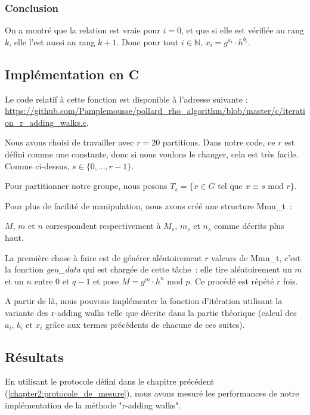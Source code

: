         \subsubsection*{Conclusion}
        On a montré que la relation est vraie pour $i = 0$, et que si elle est vérifiée au rang $k$, elle l'est aussi au rang $k + 1$. Donc pour tout $i \in \mathbb{N}$, $x_i = g^{a_i} \cdot h^{b_i}$.

      \subsection{Implémentation en C}
      \label{chapter3:r-adding:implémentation}
      Le code relatif à cette fonction est disponible à l'adresse suivante : \url{https://github.com/Pamplemousse/pollard_rho_algorithm/blob/master/c/iteration_r_adding_walks.c}.

      Nous avons choisi de travailler avec $r = 20$ partitions. Dans notre code, ce $r$ est défini comme une constante, donc si nous voulons le changer, cela est très facile. Comme ci-dessus, $s \in \{ 0,..., r - 1 \}$.

      Pour partitionner notre groupe, nous posons $T_s = \{ x \in G \text{ tel que } x \equiv s \text{ mod } r \}$.

      Pour plus de facilité de manipulation, nous avons créé une structure Mmn\_t~:

      

      $M$, $m$ et $n$ correspondent respectivement à $M_s$, $m_s$ et $n_s$ comme décrits plus haut.

      La première chose à faire est de générer aléatoirement $r$ valeurs de Mmn\_t, c'est la fonction \textit{gen\_data} qui est chargée de cette tâche~: elle tire aléatoirement un $m$ et un $n$ entre $0$ et $q - 1$ et pose $M = g^m \cdot h^n \text{ mod } p$. Ce procédé est répété $r$ fois.

      A partir de là, nous pouvons implémenter la fonction d'itération utilisant la variante des r-adding walks telle que décrite dans la partie théorique (calcul des $a_i$, $b_i$ et $x_i$ grâce aux termes précédents de chacune de ces suites).

      \subsection{Résultats}
      En utilisant le protocole défini dans le chapitre précédent (\ref{chapter2:protocole_de_mesure}), nous avons mesuré les performances de notre implémentation de la méthode "r-adding walks".

